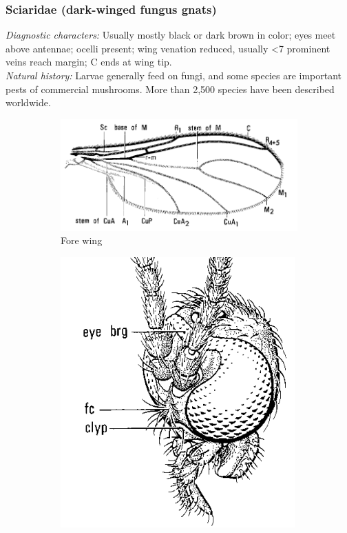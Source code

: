 \documentclass[letterpaper, 11pt]{article}
\begin{document}
\subsubsection{Sciaridae (dark-winged fungus gnats)}
\noindent{}\textit{Diagnostic characters:} Usually mostly black or dark brown in color; eyes meet above antennae; ocelli present; wing venation reduced, usually \textless7 prominent veins reach margin; C ends at wing tip.\\

\noindent{}\textit{Natural history:} Larvae generally feed on fungi, and some species are important pests of commercial mushrooms. More than 2,500 species have been described worldwide.

\begin{figure}[ht!]
    \centering
    \begin{subfigure}[ht!]{0.45\textwidth}
        \includegraphics[width=\textwidth]{SciaridWing}
        \caption{Fore wing \citep[][Fig. 15.19]{mcalpine1981manual}}
        \label{fig:sciarid1}
    \end{subfigure}
    \qquad
    \begin{subfigure}[ht!]{0.25\textwidth}
        \includegraphics[width=\textwidth]{SciaridHead}

\end{subfigure}
\end{figure}
\end{document}
